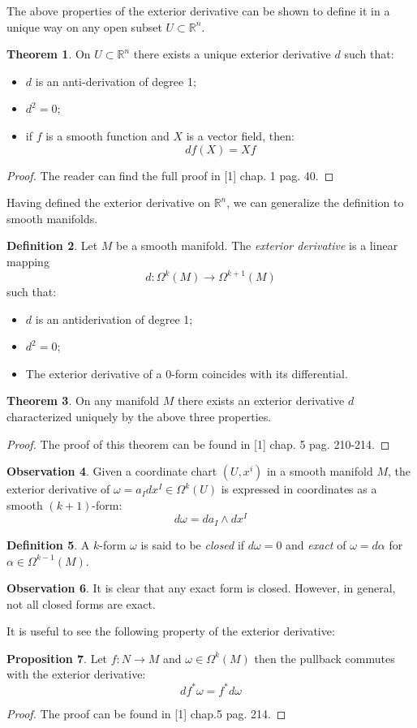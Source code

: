 \documentclass[12pt,a4paper]{report}
\theoremstyle{definition}
\newtheorem{Def}{Definition}[chapter]
\theoremstyle{Theorem}
\newtheorem{Theo}[Def]{Theorem}
\newtheorem{Prop}[Def]{Proposition}
\theoremstyle{definition}
\theoremstyle{definition}
\newtheorem{Obs}[Def]{Observation}
\begin{document}
	The above properties of the exterior derivative can be shown to define it in a unique way on any open subset $U\subset\mathbb{R}^n$.
	\begin{Theo}
		On $U\subset\mathbb{R}^n$ there exists a unique exterior derivative $d$ such that:
		\begin{itemize}
			\item $d$ is an anti-derivation of degree 1;
			\item $d^2=0$;
			\item if $f$ is a smooth function and $X$ is a vector field, then:
			$$df(X)=Xf$$
		\end{itemize}
	\end{Theo}
	\begin{proof}
		The reader can find the full proof in [1] chap. 1 pag. 40.
	\end{proof}
	Having defined the exterior derivative on $\mathbb{R}^n$, we can generalize the definition to smooth manifolds.
	\begin{Def}
		Let $M$ be a smooth manifold. The \textit{exterior derivative} is a linear mapping 
		$$d:\Omega^k(M)\rightarrow\Omega^{k+1}(M)$$
		such that:
		\begin{itemize}
			\item $d$ is an antiderivation of degree 1;
			\item $d^2=0$;
			\item The exterior derivative of a 0-form coincides with its differential.
		\end{itemize}
	\end{Def}
	\begin{Theo}
		On any manifold $M$ there exists an exterior derivative $d$ characterized uniquely by the above three properties.
	\end{Theo}
	\begin{proof}
		The proof of this theorem can be found in [1] chap. 5 pag. 210-214.
	\end{proof}
	\begin{Obs}
		Given a coordinate chart $(U,x^i)$ in a smooth manifold $M$, the exterior derivative of $\omega=a_Idx^I\in \Omega^k(U)$ is expressed in coordinates as a smooth $(k+1)$-form:
		$$d\omega=da_I\wedge dx^I$$
	\end{Obs}
	\begin{Def}
		A $k$-form $\omega$ is said to be \textit{closed} if $d\omega=0$ and \textit{exact} of $\omega=d\alpha$ for $\alpha\in\Omega^{k-1}(M)$.
	\end{Def}
	\begin{Obs}
		It is clear that any exact form is closed. However, in general, not all closed forms are exact.
	\end{Obs}
	It is useful to see the following property of the exterior derivative:
	\begin{Prop}
		Let $f:N\rightarrow M$ and $\omega\in \Omega^k(M)$ then the pullback commutes with the exterior derivative:
		$$df^*\omega=f^*d\omega$$
	\end{Prop}
	\begin{proof}
		The proof can be found in [1] chap.5 pag. 214.
	\end{proof}
\end{document}
